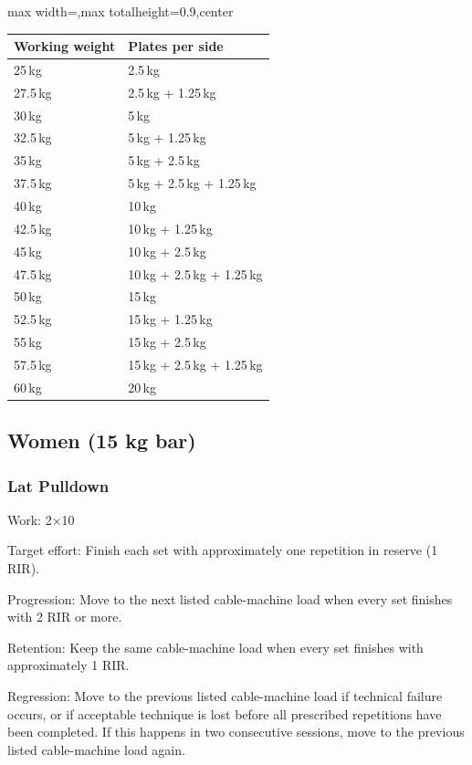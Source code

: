 \documentclass[11pt,a4paper]{article}
\newcommand{\tablearraystretch}{1.15}
\begin{document}
\begin{center}
\renewcommand{\arraystretch}{\tablearraystretch}
\begin{adjustbox}{max width=\linewidth,max totalheight=0.9\textheight,center}
\begin{tabular}{ll}
\toprule
Working weight & Plates per side \\
\midrule
25\,kg & 2.5\,kg \\
27.5\,kg & 2.5\,kg + 1.25\,kg \\
30\,kg & 5\,kg \\
32.5\,kg & 5\,kg + 1.25\,kg \\
35\,kg & 5\,kg + 2.5\,kg \\
37.5\,kg & 5\,kg + 2.5\,kg + 1.25\,kg \\
40\,kg & 10\,kg \\
42.5\,kg & 10\,kg + 1.25\,kg \\
45\,kg & 10\,kg + 2.5\,kg \\
47.5\,kg & 10\,kg + 2.5\,kg + 1.25\,kg \\
50\,kg & 15\,kg \\
52.5\,kg & 15\,kg + 1.25\,kg \\
55\,kg & 15\,kg + 2.5\,kg \\
57.5\,kg & 15\,kg + 2.5\,kg + 1.25\,kg \\
60\,kg & 20\,kg \\
\bottomrule
\end{tabular}
\end{adjustbox}
\renewcommand{\arraystretch}{1}
\end{center}

\newpage
\subsection{Women (15 kg bar)}

\subsubsection{Lat Pulldown}

Work: 2$\times$10

Target effort: Finish each set with approximately one repetition in reserve (1 RIR).

Progression: Move to the next listed cable-machine load when every set finishes with 2 RIR or more.

Retention: Keep the same cable-machine load when every set finishes with approximately 1 RIR.

Regression: Move to the previous listed cable-machine load if technical failure occurs, or if acceptable technique is lost before all prescribed repetitions have been completed. If this happens in two consecutive sessions, move to the previous listed cable-machine load again.
\end{document}

